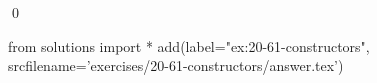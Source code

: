 
\begin{ex}
  \label{ex:20-61-constructors}
  
  \qed
\end{ex}
\begin{python0}
from solutions import *
add(label="ex:20-61-constructors",
    srcfilename='exercises/20-61-constructors/answer.tex')
\end{python0}
